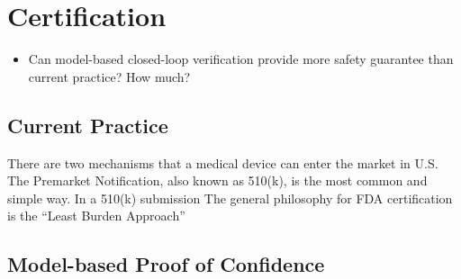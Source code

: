 

\chapter{Certification}
\begin{itemize}
          	\item Can model-based closed-loop verification provide more safety guarantee than current practice? How much?
          \end{itemize}
\section{Current Practice}
There are two mechanisms that a medical device can enter the market in U.S. The Premarket Notification, also known as 510(k), is the most common and simple way. In a 510(k) submission The general philosophy for FDA certification is the "`Least Burden Approach"'
\section{Model-based Proof of Confidence}
